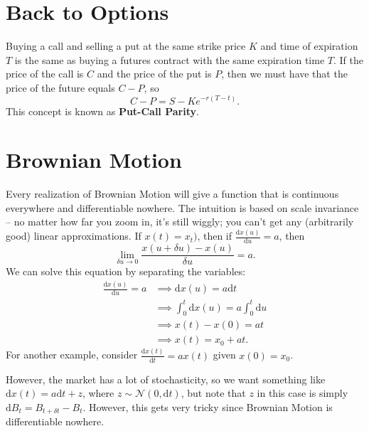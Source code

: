 \section{Back to Options}
Buying a call and selling a put at the same strike price $K$ and time of expiration $T$ is the same as buying a futures contract with the same expiration time $T$. If the price of the call is $C$ and the price of the put is $P$, then we must have that the price of the future equals $C-P$, so $$ C-P = S-K e^{-r(T-t)}. $$ This concept is known as \textbf{Put-Call Parity}.

\section{Brownian Motion}
Every realization of Brownian Motion will give a function that is continuous everywhere and differentiable nowhere. The intuition is based on scale invariance -- no matter how far you zoom in, it's still wiggly; you can't get any (arbitrarily good) linear approximations. If $x(t)=x_t)$, then if $\frac{\mathrm dx(u)}{\mathrm du} = a$, then $$\lim_{\delta u\to 0}\frac{x(u+\delta u)-x(u)}{\delta u} = a.$$ We can solve this equation by separating the variables: \begin{align*}
	\frac{\mathrm dx(u)}{\mathrm du} = a &\implies \mathrm dx(u) = a\mathrm dt \\
										 &\implies \int_0^t \mathrm dx(u) = a\int_0^t\mathrm du \\
										 &\implies x(t) - x(0) = at \\
										 &\implies x(t) = x_0 + at.
\end{align*} For another example, consider $\frac{\mathrm dx(t)}{\mathrm dt} = ax(t)$ given $x(0)=x_0$.

However, the market has a lot of stochasticity, so we want something like $\mathrm dx(t) = a\mathrm dt + z$, where $z\sim\mathcal N(0,\mathrm dt)$, but note that $z$ in this case is simply $\mathrm dB_t=B_{t+\delta t}-B_{t}$. However, this gets very tricky since Brownian Motion is differentiable nowhere.

